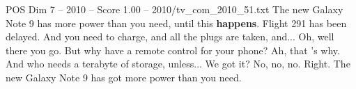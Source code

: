 \begin{textsample}{POS Dim 7 – 2010 – Score 1.00 – 2010/tv\_com\_2010\_51.txt}  \label{ex:f7_pos_077}
The new Galaxy Note 9 has more power than you need, until this \textbf{happens}.
Flight 291 has been delayed.
And you need to charge, and all the plugs are taken, and...
Oh, well there you go.
But why have a remote control for your phone?
Ah, that 's why.
And who needs a terabyte of storage, unless...
We got it?
No, no, no.
Right.
The new Galaxy Note 9 has got more power than you need.

\end{textsample}
